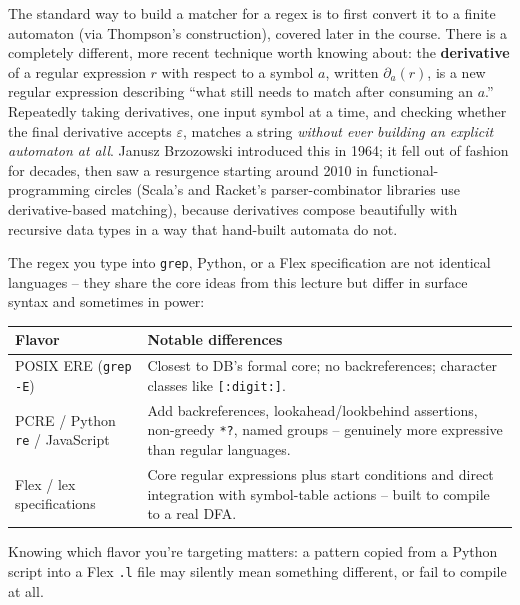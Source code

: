 \documentclass[full-course-notes.tex]{subfiles}
\begin{document}
\begin{enrichment}
The standard way to build a matcher for a regex is to first convert it to a finite automaton
(via Thompson's construction), covered later in the course. There is a completely different,
more recent technique worth knowing about: the \textbf{derivative} of a regular expression $r$
with respect to a symbol $a$, written $\partial_a(r)$, is a new regular expression describing
``what still needs to match after consuming an $a$.'' Repeatedly taking derivatives, one input
symbol at a time, and checking whether the final derivative accepts $\varepsilon$, matches a
string \emph{without ever building an explicit automaton at all}. Janusz Brzozowski introduced
this in 1964; it fell out of fashion for decades, then saw a resurgence starting around 2010 in
functional-programming circles (Scala's and Racket's parser-combinator libraries use
derivative-based matching), because derivatives compose beautifully with recursive data types
in a way that hand-built automata do not.
\end{enrichment}

\begin{enrichment}
The regex you type into \texttt{grep}, Python, or a Flex specification are not identical
languages -- they share the core ideas from this lecture but differ in surface syntax and
sometimes in power:
\begin{center}
\small
\renewcommand{\arraystretch}{1.3}
\begin{tabularx}{\textwidth}{@{}l X@{}}
\toprule
\textbf{Flavor} & \textbf{Notable differences} \\
\midrule
POSIX ERE (\texttt{grep -E}) & Closest to DB's formal core; no backreferences; character
classes like \texttt{[:digit:]}. \\
PCRE / Python \texttt{re} / JavaScript & Add backreferences, lookahead/lookbehind assertions,
non-greedy \texttt{*?}, named groups -- genuinely more expressive than regular languages. \\
Flex / lex specifications & Core regular expressions plus start conditions and direct
integration with symbol-table actions -- built to compile to a real DFA. \\
\bottomrule
\end{tabularx}
\end{center}
Knowing which flavor you're targeting matters: a pattern copied from a Python script into a
Flex \texttt{.l} file may silently mean something different, or fail to compile at all.
\end{enrichment}
\end{document}

